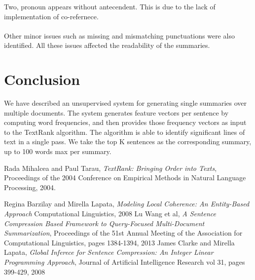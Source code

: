 \documentclass[11pt]{article}
\begin{document}
Two, pronoun appears without antecendent. This is due to the lack of implementation of co-refernece. 
\\

\\

Other minor issues such as missing and mismatching punctuations were also identified. All these issues affected the readability of the summaries.


\section{Conclusion}
 We have described an unsupervised system for generating single summaries over multiple documents. The system generates feature vectors per sentence by computing word frequencies, and then provides those frequency vectors as input to the TextRank algorithm. The algorithm is able to identify significant lines of text in a single pass. We take the top K sentences as the corresponding summary, up to 100 words max per summary.

%
%
\begin{thebibliography}{}

	Rada Mihalcea and Paul Tarau,
	\textit{TextRank: Bringing Order into Texts},
	Proceedings of the 2004 Conference on Empirical Methods in Natural Language Processing,
	2004.

    Regina Barzilay and Mirella Lapata,
    \textit{Modeling Local Coherence: An Entity-Based Approach}
    Computational Linguistics, 
    2008
	Lu Wang et al,
	\textit{A Sentence Compression Based Framework to Query-Focused Multi-Document Summarization},
	Proceedings of the 51st Annual Meeting of the Association for Computational Linguistics, pages 1384-1394,
	2013
	James Clarke and Mirella Lapata,
	\textit{Global Inferece for Sentence Compression: An Integer Linear Programming Approach},
	Journal of Artificial Intelligence Research vol 31, pages 399-429,
	2008

\end{thebibliography}
\end{document}
